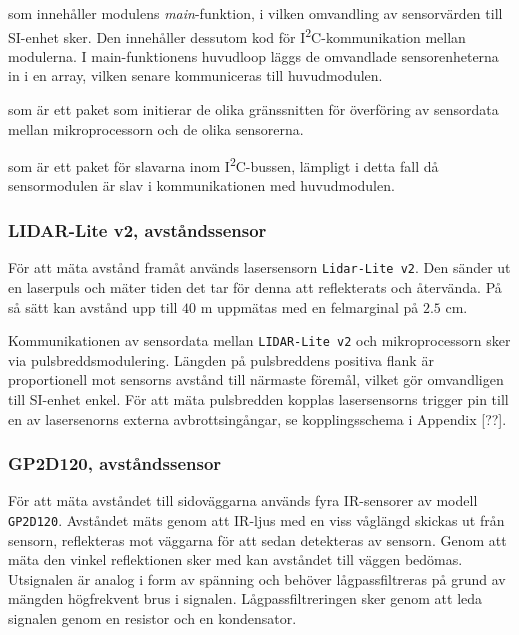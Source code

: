 \documentclass[11pt]{article}
\begin{document}
\begin{flushleft}
\begin{description}[style=unboxed, leftmargin=0cm]
  \item[sensorModule.c] som innehåller modulens \textit{main}-funktion, i vilken omvandling av sensorvärden till SI-enhet sker. Den innehåller dessutom kod för I\textsuperscript{2}C-kommunikation mellan modulerna. I main-funktionens huvudloop läggs de omvandlade sensorenheterna in i en array, vilken senare kommuniceras till huvudmodulen.
  \item[sensorInit.h] som är ett paket som initierar de olika gränssnitten för överföring av sensordata mellan mikroprocessorn och de olika sensorerna.
  \item[I2C\_slave.h] som är ett paket för slavarna inom I\textsuperscript{2}C-bussen, lämpligt i detta fall då sensormodulen är slav i kommunikationen med huvudmodulen.
\end{description}

\subsubsection{LIDAR-Lite v2, avståndssensor}
För att mäta avstånd framåt används lasersensorn \verb+Lidar-Lite v2+. Den sänder ut en laserpuls och mäter tiden det tar för denna att reflekterats och återvända. På så sätt kan avstånd upp till $40$ m uppmätas med en felmarginal på $2.5$ cm. 

Kommunikationen av sensordata mellan \verb+LIDAR-Lite v2+ och mikroprocessorn sker via pulsbreddsmodulering. Längden på pulsbreddens positiva flank är proportionell mot sensorns avstånd till närmaste föremål, vilket gör omvandligen till SI-enhet enkel. För att mäta pulsbredden kopplas lasersensorns trigger pin till en av lasersenorns externa avbrottsingångar, se kopplingsschema i Appendix [??]. 


\subsubsection{GP2D120, avståndssensor}
För att mäta avståndet till sidoväggarna används fyra IR-sensorer av modell \verb+GP2D120+. Avståndet mäts genom att IR-ljus med en viss våglängd skickas ut från sensorn, reflekteras mot väggarna för att sedan detekteras av sensorn. Genom att mäta den vinkel reflektionen sker med kan avståndet till väggen bedömas. Utsignalen är analog i form av spänning och behöver lågpassfiltreras på grund av mängden högfrekvent brus i signalen. Lågpassfiltreringen sker genom att leda signalen genom en resistor och en kondensator.


\end{flushleft}
\end{document}
